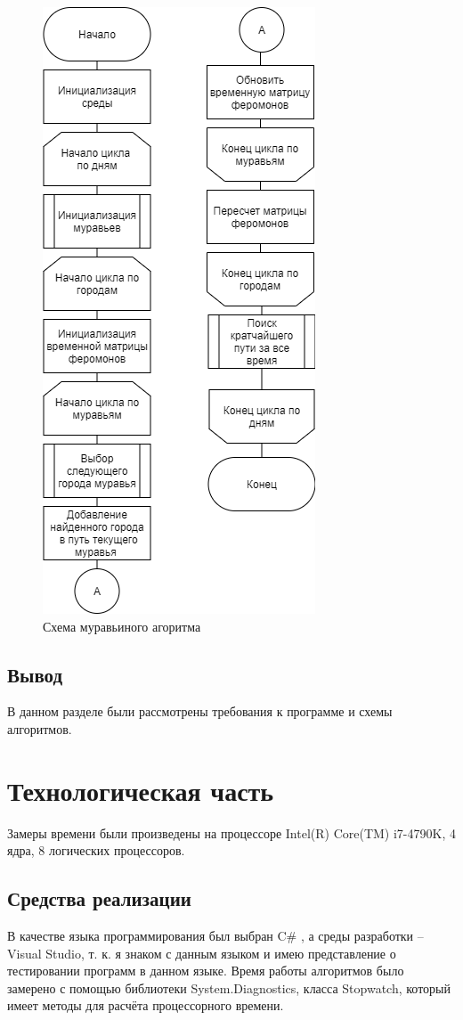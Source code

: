 \documentclass[12pt]{report}
\begin{document}
\begin{figure}[H]
        	\centering
        	\includegraphics[scale = 0.4]{Ant.png}
        	\caption{Схема муравьиного агоритма}
        	\label{fig:ant}
\end{figure}


\section*{Вывод}
В данном разделе были рассмотрены требования к программе и схемы алгоритмов.
 
\newpage
\chapter{Технологическая часть}
Замеры времени были произведены на процессоре Intel(R) Core(TM) i7-4790K, 4 ядра, 8 логических процессоров.

\section{Средства реализации}
В качестве языка программирования был выбран C\# \cite{Microsoft}, а среды разработки -- Visual Studio, т. к. я знаком с данным языком и имею представление о тестировании программ в данном языке. Время работы алгоритмов было замерено с помощью библиотеки System.Diagnostics, класса Stopwatch, который имеет методы для расчёта процессорного времени.
\end{document}
